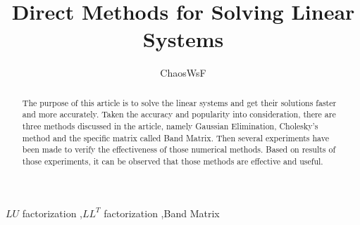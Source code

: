 \documentclass[preprint,12pt]{elsarticle}
\begin{document}
\begin{frontmatter}


\title{Direct Methods for Solving Linear Systems}




\author{ChaosWsF}

\address{No.*, X University}

\begin{abstract}
The purpose of this article is to solve the linear systems and get their solutions faster and more accurately. Taken the accuracy and popularity into consideration, there are three methods discussed in the article, namely Gaussian Elimination, Cholesky's method and the specific matrix called Band Matrix. Then several experiments have been made to verify the effectiveness of those numerical methods. Based on results of those experiments, it can be observed that those methods are effective and useful.
\end{abstract}

\begin{keyword}
$LU$ factorization \sep $LL^T$ factorization \sep Band Matrix


\end{keyword}

\end{frontmatter}

\end{document}

